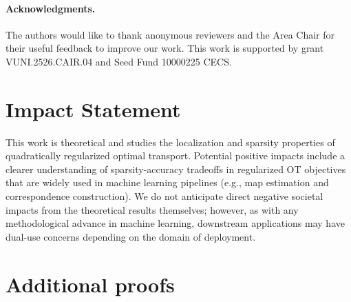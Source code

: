 \documentclass{article}
\theoremstyle{plain}
\theoremstyle{definition}
\theoremstyle{remark}
\numberwithin{equation}{section}
\begin{document}
\paragraph{Acknowledgments.} The authors would like to thank anonymous reviewers and the Area Chair for their useful feedback to improve our work. This work is supported by grant VUNI.2526.CAIR.04 and Seed Fund 10000225 CECS.

\section*{Impact Statement}
This work is theoretical and studies the localization and sparsity properties of quadratically regularized optimal transport.
Potential positive impacts include a clearer understanding of sparsity-accuracy tradeoffs in regularized OT objectives that are widely used in machine learning pipelines (e.g., map estimation and correspondence construction).
We do not anticipate direct negative societal impacts from the theoretical results themselves; however, as with any methodological advance in machine learning, downstream applications may have dual-use concerns depending on the domain of deployment.


\newpage
\appendix
\onecolumn
\section{Additional proofs}
\end{document}
